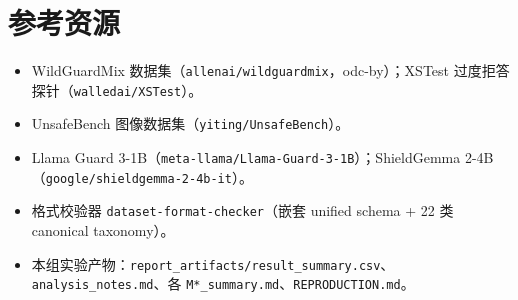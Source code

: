 \documentclass[11pt]{ctexart}
\begin{document}
\section*{参考资源}
\small
\begin{itemize}\itemsep0.1em
\item WildGuardMix 数据集（\texttt{allenai/wildguardmix}，odc-by）；XSTest 过度拒答探针（\texttt{walledai/XSTest}）。
\item UnsafeBench 图像数据集（\texttt{yiting/UnsafeBench}）。
\item Llama Guard 3-1B（\texttt{meta-llama/Llama-Guard-3-1B}）；ShieldGemma 2-4B（\texttt{google/shieldgemma-2-4b-it}）。
\item 格式校验器 \texttt{dataset-format-checker}（嵌套 unified schema + 22 类 canonical taxonomy）。
\item 本组实验产物：\texttt{report\_artifacts/result\_summary.csv}、\texttt{analysis\_notes.md}、各 \texttt{M*\_summary.md}、\texttt{REPRODUCTION.md}。
\end{itemize}
\end{document}
